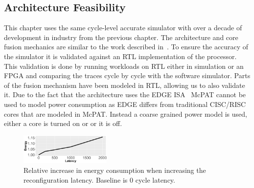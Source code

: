 \subsection{Architecture Feasibility}
This chapter uses the same cycle-level accurate simulator with over a decade of development in industry from the previous chapter.
The architecture and core fusion mechanics are similar to the work described in~\cite{kim2007tflex,putnam2010e2}.
To ensure the accuracy of the simulator it is validated against an RTL implementation of the processor.
This validation is done by running workloads on RTL either in simulation or an FPGA and comparing the traces cycle by cycle with the software simulator.
Parts of the fusion mechanism have been modeled in RTL, allowing us to also validate it.
Due to the fact that the architecture uses the EDGE ISA~\cite{smith2006edge} McPAT cannot be used to model power consumption as EDGE differs from traditional CISC/RISC cores that are modeled in McPAT.
Instead a coarse grained power model is used, either a core is turned on or or it is off. 


\begin{figure}[t]
    \centering
	\includegraphics[width=0.4\textwidth]{cases-paper/graphics/Exploration/lat_en_2000.pdf}
\vspace*{-5mm}
    \caption{Relative increase in energy consumption when increasing the reconfiguration latency. Baseline is 0 cycle latency.}
    \label{fig:enlatency}
\end{figure}
